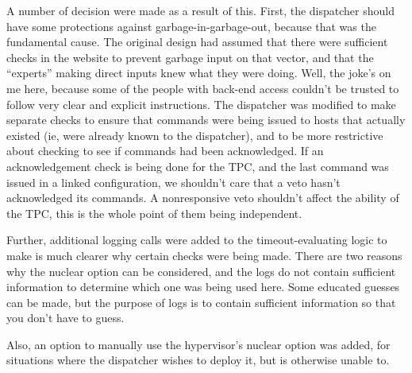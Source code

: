 A number of decision were made as a result of this.
First, the dispatcher should have some protections against garbage-in-garbage-out, because that was the fundamental cause.
The original design had assumed that there were sufficient checks in the website to prevent garbage input on that vector, and that the ``experts'' making direct inputs knew what they were doing.
Well, the joke's on me here, because some of the people with back-end access couldn't be trusted to follow very clear and explicit instructions.
The dispatcher was modified to make separate checks to ensure that commands were being issued to hosts that actually existed (ie, were already known to the dispatcher), and to be more restrictive about checking to see if commands had been acknowledged.
If an acknowledgement check is being done for the TPC, and the last command was issued in a linked configuration, we shouldn't care that a veto hasn't acknowledged its commands.
A nonresponsive veto shouldn't affect the ability of the TPC, this is the whole point of them being independent.

Further, additional logging calls were added to the timeout-evaluating logic to make is much clearer why certain checks were being made.
There are two reasons why the nuclear option can be considered, and the logs do not contain sufficient information to determine which one was being used here.
Some educated guesses can be made, but the purpose of logs is to contain sufficient information so that you don't have to guess.

Also, an option to manually use the hypervisor's nuclear option was added, for situations where the dispatcher wishes to deploy it, but is otherwise unable to.
